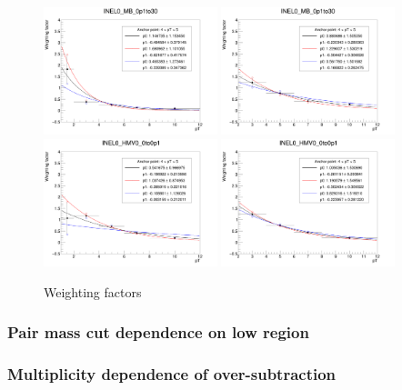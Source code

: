 \begin{figure}[b]
    \includegraphics[width=0.45\textwidth]{plots/s2_pTW1to12_INEL0_MB_0p1to30.png}
    \includegraphics[width=0.45\textwidth]{plots/s2_pTW2to12_INEL0_MB_0p1to30.png}
    \includegraphics[width=0.45\textwidth]{plots/s2_pTW1to12_INEL0_HMV0_0to0p1.png}
    \includegraphics[width=0.45\textwidth]{plots/s2_pTW2to12_INEL0_HMV0_0to0p1.png}
    \caption{Weighting factors }
    \label{fig:s2_pTW}
\end{figure}

\clearpage
\subsubsection{Pair mass cut dependence on low \pt region}

\subsubsection{Multiplicity dependence of \Xib over-subtraction}
